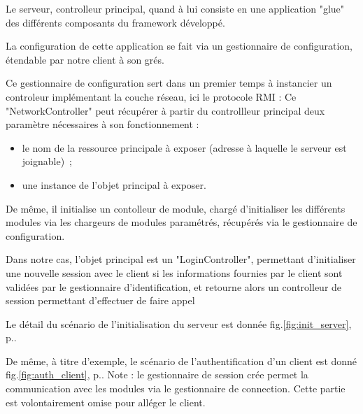 Le serveur, controlleur principal, quand à lui consiste en une application "glue" des différents composants du framework développé.

La configuration de cette application se fait via un gestionnaire de configuration, étendable par notre client à son grés.


Ce gestionnaire de configuration sert dans un premier temps à instancier un controleur implémentant la couche réseau, ici le protocole RMI :
Ce "NetworkController" peut récupérer à partir du controllleur principal deux paramètre nécessaires à son fonctionnement :
\begin{itemize}
 \item le nom de la ressource principale à exposer (adresse à laquelle le serveur est joignable)~;
 \item une instance de l'objet principal à exposer.
\end{itemize}
De même, il initialise un contolleur de module, chargé d'initialiser les différents modules via les chargeurs de modules paramétrés, récupérés via le gestionnaire de configuration.

Dans notre cas, l'objet principal est un "LoginController", permettant d'initialiser une nouvelle session avec le client si les informations fournies par le client sont validées par le gestionnaire d'identification, et retourne alors un controlleur de session permettant d'effectuer de faire appel 


Le détail du scénario de l'initialisation du serveur est donnée fig.\ref{fig:init_server}, p.\pageref{fig:init_server}.

De même, à titre d'exemple, le scénario de l'authentification d'un client est donné fig.\ref{fig:auth_client}, p.\pageref{fig:auth_client}. Note : le gestionnaire de session crée permet la communication avec les modules via le gestionnaire de connection. Cette partie est volontairement omise pour alléger le client.
